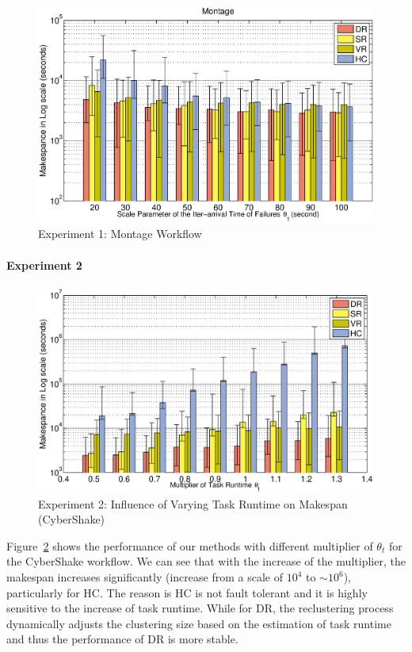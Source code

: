 \begin{figure}[!htb]
\centering
  \includegraphics[width=1\linewidth]{figures/tolerance/montage.eps}
  \caption{Experiment 1: Montage Workflow}
  \label{fig:expr_montage}
\end{figure}

\paragraph{\textbf{Experiment 2}}

\begin{figure}[!htb]
\centering
  \includegraphics[width=1\linewidth]{figures/tolerance/t.eps}
  \caption{Experiment 2:  Influence of Varying Task Runtime on Makespan (CyberShake)}
  \label{fig:expr_t}
\end{figure}

Figure~\ref{fig:expr_t} shows the performance of our methods with different multiplier of $\theta_{t}$ for the CyberShake workflow. We can see that with the increase of the multiplier, the makespan increases significantly (increase from a scale of $10^4$ to $\sim 10^6$), particularly for HC. The reason is HC is not fault tolerant and it is highly sensitive to the increase of task runtime. While for DR, the reclustering process dynamically adjusts the clustering size based on the estimation of task runtime and thus the performance of DR is more stable. 

